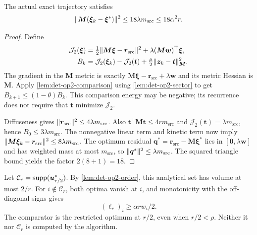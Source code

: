 \begin{lemma}
\label{lem:det-op2-response}
The actual exact trajectory satisfies
\begin{equation}\label{eq:det-op2-response-bound}
 \lVert\bm{M}(\bm{\xi}_k-\bm{\xi}^*)\rVert^2
       \leq18\lambda m_{\mathrm{src}}\leq18\alpha^2r.
\end{equation}
\end{lemma}
\begin{proof}
Define
\begin{align*}
 \mathcal J_2(\bm{\xi})&=\tfrac12\lVert\bm{M}\bm{\xi}
                    -\bm{r}_{\mathrm{src}}\rVert^2
                  +\lambda(\bm{M}\bm{w})^{\top}\bm{\xi},\\
 B_k&=\mathcal J_2(\bm{\xi}_k)-\mathcal J_2(\bm{t})
                         +\tfrac\mu2\lVert\bm{z}_k-\bm{t}\rVert_{\bm{M}}^2.
\end{align*}
The gradient in the $\bm{M}$ metric is exactly
$\bm{M}\bm{\xi}-\bm{r}_{\mathrm{src}}+\lambda\bm{w}$ and its metric
Hessian is $\bm{M}$. Apply \cref{lem:det-op2-comparison} using
\cref{lem:det-op2-sector} to get $B_{k+1}\leq(1-\theta)B_k$.
This comparison energy may be negative; its recurrence does not require
that $\bm{t}$ minimize $\mathcal J_2$.

Diffuseness gives
$\lVert\bm{r}_{\mathrm{src}}\rVert^2\leq4\lambda m_{\mathrm{src}}$.
Also $\bm{t}^{\top}\bm{M}\bm{t}\leq4r m_{\mathrm{src}}$ and
$\mathcal J_2(\bm{t})=\lambda m_{\mathrm{src}}$, hence
$B_0\leq3\lambda m_{\mathrm{src}}$. The nonnegative linear term and
kinetic term now imply
$\lVert\bm{M}\bm{\xi}_k-\bm{r}_{\mathrm{src}}\rVert^2
\leq8\lambda m_{\mathrm{src}}$.
The optimum residual
$\bm{q}^*=\bm{r}_{\mathrm{src}}-\bm{M}\bm{\xi}^*$ lies in
$[\bm{0},\lambda\bm{w}]$ and has weighted mass at most
$m_{\mathrm{src}}$, so $\lVert\bm{q}^*\rVert^2\leq\lambda m_{\mathrm{src}}$.
The squared triangle bound yields the factor $2(8+1)=18$.
\end{proof}

Let $\mathcal C_r=\operatorname{supp}(\bm{u}_{r/2}^*)$. By
\cref{lem:det-op2-order}, this analytical set has volume at most $2/r$.
For $i\notin\mathcal C_r$, both optima vanish at $i$, and monotonicity
with the off-diagonal signs gives
\begin{equation}\label{eq:det-op2-slack-margin}
 (\ell_r)_i\geq\alpha r w_i/2.
\end{equation}
The comparator is the restricted optimum at $r/2$, even when $r/2<\rho$.
Neither it nor $\mathcal C_r$ is computed by the algorithm.

